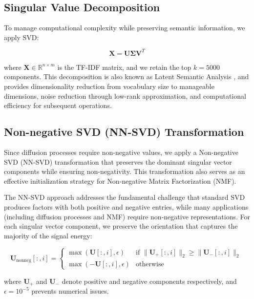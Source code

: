 \documentclass[12pt,a4paper]{article}
\begin{document}
\subsection{Singular Value Decomposition}

To manage computational complexity while preserving semantic information, we apply SVD:

\begin{equation}
\mathbf{X} = \mathbf{U}\mathbf{\Sigma}\mathbf{V}^T
\end{equation}

where $\mathbf{X} \in \mathbb{R}^{n \times m}$ is the TF-IDF matrix, and we retain the top $k = 5000$ components. This decomposition is also known as Latent Semantic Analysis \cite{deerwester1990indexing}, and provides dimensionality reduction from vocabulary size to manageable dimensions, noise reduction through low-rank approximation, and computational efficiency for subsequent operations.
\subsection{Non-negative SVD (NN-SVD) Transformation}

Since diffusion processes require non-negative values, we apply a Non-negative SVD (NN-SVD) \cite{boutsidis2008svd} transformation that preserves the dominant singular vector components while ensuring non-negativity. This transformation also serves as an effective initialization strategy for Non-negative Matrix Factorization (NMF).

The NN-SVD approach addresses the fundamental challenge that standard SVD produces factors with both positive and negative entries, while many applications (including diffusion processes and NMF) require non-negative representations. For each singular vector component, we preserve the orientation that captures the majority of the signal energy:

\begin{equation}
\mathbf{U}_{\text{nonneg}}[:,i] = \begin{cases}
\max(\mathbf{U}[:,i], \epsilon) & \text{if } \|\mathbf{U}_{+}[:,i]\|_2 \geq \|\mathbf{U}_{-}[:,i]\|_2 \\
\max(-\mathbf{U}[:,i], \epsilon) & \text{otherwise}
\end{cases}
\end{equation}

where $\mathbf{U}_{+}$ and $\mathbf{U}_{-}$ denote positive and negative components respectively, and $\epsilon = 10^{-5}$ prevents numerical issues.
\end{document}
